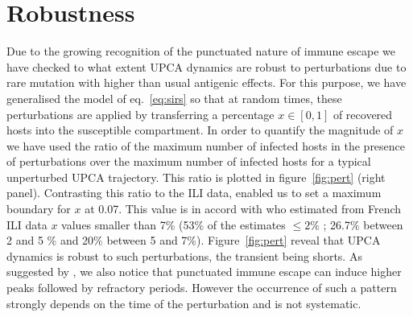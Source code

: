 \section{Robustness}
\label{sec:robustness}

Due to the growing recognition of the punctuated nature of immune
escape \citep{Cobey2008} we have checked to what extent UPCA dynamics
are robust to perturbations due to rare mutation with higher than
usual antigenic effects. For this purpose, we have generalised the
model of eq.~\eqref{eq:sirs} so that at random times, these
perturbations are applied by transferring a percentage $x \in [0,1]$
of recovered hosts into the susceptible compartment. In order to
quantify the magnitude of $x$ we have used the ratio of the maximum
number of infected hosts in the presence of perturbations over the
maximum number of infected hosts for a typical unperturbed UPCA
trajectory. This ratio is plotted in figure~\ref{fig:pert} (right
panel).  Contrasting this ratio to the ILI data, enabled us to set a
maximum boundary for $x$ at 0.07.  This value is in accord with
\citet{Finkenstaedt2005} who estimated from French ILI data $x$
values smaller than 7\% (53\% of the estimates $\leq 2\%$ ; 26.7\%
between 2 and 5 \% and 20\% between 5 and 7\%).
Figure~\ref{fig:pert} reveal that UPCA dynamics is robust to such
perturbations, the transient being shorts.  As suggested by
\citep{Koelle2006}, we also notice that punctuated immune escape can
induce higher peaks followed by refractory periods. However the
occurrence of such a pattern strongly depends on the time of the
perturbation and is not systematic.

